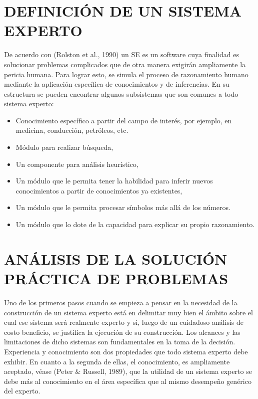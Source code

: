 \section{	DEFINICIÓN DE UN SISTEMA EXPERTO}
De acuerdo con (Rolston et al., 1990) un SE es un software cuya finalidad es  solucionar problemas complicados que de otra manera exigirán ampliamente la pericia humana. Para lograr esto, se simula el proceso de razonamiento humano mediante la aplicación específica de conocimientos y de inferencias. En su estructura se pueden encontrar algunos subsistemas que son comunes a todo sistema experto:
\begin{itemize}
\item 	Conocimiento específico a partir del campo de interés, por ejemplo, en medicina, conducción, petróleos, etc.
\item Módulo para realizar búsqueda,
\item 	Un componente para análisis heurístico,
\item	Un módulo que le permita tener la habilidad para inferir nuevos conocimientos a partir de conocimientos ya existentes,
\item 	Un módulo que le permita  procesar símbolos más allá de los números.
\item 	Un módulo que lo dote de la capacidad para explicar su propio razonamiento.
\end{itemize}
\section{	ANÁLISIS DE LA SOLUCIÓN PRÁCTICA DE PROBLEMAS}
Uno de los primeros pasos cuando se empieza a pensar en la necesidad de la construcción de un sistema experto está en delimitar muy bien el ámbito sobre el cual ese sistema será realmente experto y si, luego de un cuidadoso análisis de costo beneficio, se justifica la ejecución de su construcción.  Los alcances y las limitaciones de dicho sistemas son fundamentales en la toma de la decisión.\\
Experiencia y conocimiento son dos propiedades que todo sistema experto debe exhibir.  En cuanto a la segunda de ellas, el conocimiento, es ampliamente aceptado, véase (Peter \& Russell, 1989), que la utilidad de un sistema experto se debe más al conocimiento  en el área específica que al mismo desempeño genérico del experto. 
